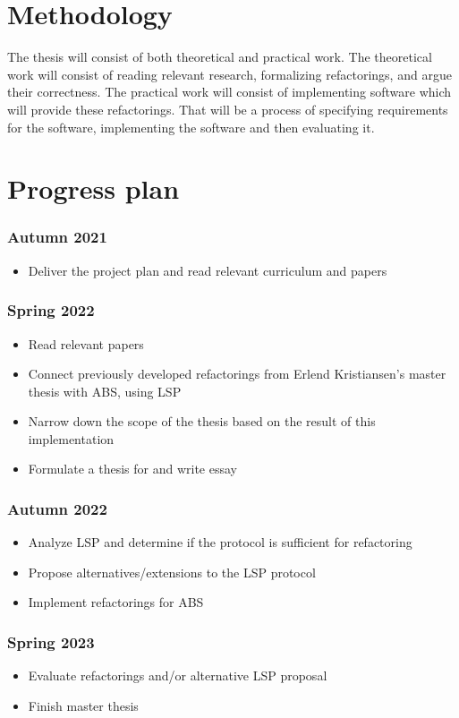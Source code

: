 \documentclass[11pt]{article}
\begin{document}
\section*{Methodology}

The thesis will consist of both theoretical and practical work. The theoretical work will
consist of reading relevant research, formalizing refactorings, and argue their
correctness. The practical work will consist of implementing software which will provide
these refactorings. That will be a process of specifying requirements for the software,
implementing the software and then evaluating it.

\vspace{-0.5cm}
\section*{Progress plan}

\subsubsection*{Autumn 2021}
\begin{itemize}
    \itemsep0em
    \item Deliver the project plan and read relevant curriculum and papers
\end{itemize}
\subsubsection*{Spring 2022}
\vspace{-0.25cm}
\begin{itemize}
    \itemsep0em
    \item Read relevant papers
    \item Connect previously developed refactorings from Erlend Kristiansen's master
        thesis\textsubscript{\cite{DBLP:conf/nik/KristiansenS14}} with ABS, using LSP
    \item Narrow down the scope of the thesis based on the result of this implementation
    \item Formulate a thesis for and write essay
\end{itemize}
\vspace{-0.25cm}
\subsubsection*{Autumn 2022}
\vspace{-0.5cm}
\begin{itemize}
    \itemsep0em
    \item Analyze LSP and determine if the protocol is sufficient for refactoring
    \item Propose alternatives/extensions to the LSP protocol
    \item Implement refactorings for ABS 
\end{itemize}
\vspace{-0.25cm}
\subsubsection*{Spring 2023}
\vspace{-0.4cm}
\begin{itemize}
    \itemsep0em
    \item Evaluate refactorings and/or alternative LSP proposal
    \item Finish master thesis
\end{itemize}


\printbibliography
\end{document}
